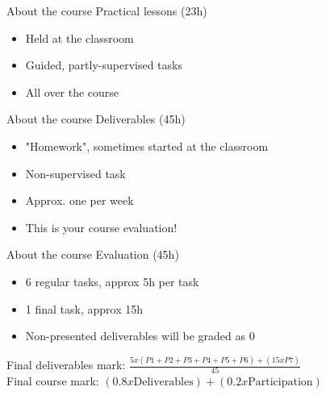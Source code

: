 \documentclass{beamer}
\begin{document}
\begin{frame}{About the course}
	Practical lessons (23h)
	\begin{itemize}
		\item Held at the classroom
		\item Guided, partly-supervised tasks
		\item All over the course
	\end{itemize}
\end{frame}

\begin{frame}{About the course}
	Deliverables (45h)
	\begin{itemize}
		\item "Homework", sometimes started at the classroom
		\item Non-supervised task
		\item Approx. one per week
		\item This is your course evaluation!
	\end{itemize}
\end{frame}

\begin{frame}{About the course}
	Evaluation (45h)
	\begin{itemize}
		\item 6 regular tasks, approx 5h per task
		\item 1 final task, approx 15h
		\item Non-presented deliverables will be graded as 0
	\end{itemize}
	\vspace{5mm}
	Final deliverables mark: $\frac{5 x (P1+P2+P3+P4+P5+P6) + (15 x P7)}{45}$\\
	\vspace{5mm}
	Final course mark: $(0.8x\text{Deliverables}) + (0.2x\text{Participation})$
\end{frame}

\end{document}
